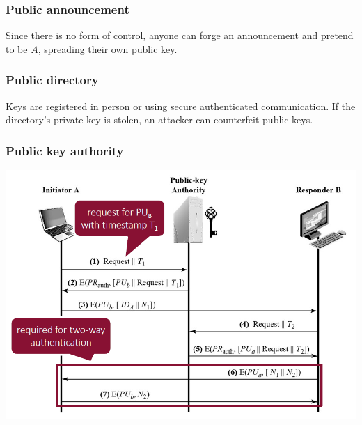 \documentclass[12pt]{article}
\begin{document}
 \subsubsection{Public announcement}
 Since there is no form of control, anyone can forge an announcement and pretend to be $A$, spreading their own public key.
 
 \subsubsection{Public directory}
 Keys are registered in person or using secure authenticated communication. If the directory's private key is stolen, an attacker can counterfeit public keys.
 
 \subsubsection{Public key authority}
 \includegraphics[width=\linewidth]{./slides/L5P4PKA.PNG}
 
\end{document}
